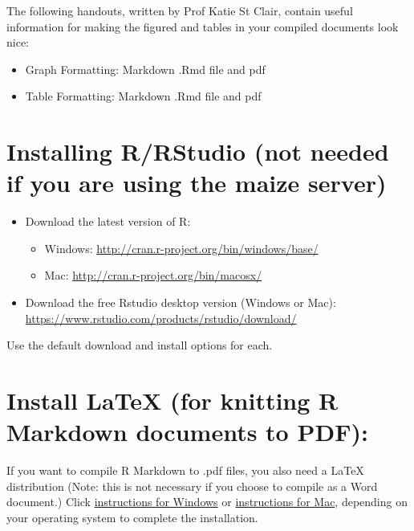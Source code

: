 \documentclass[
]{book}
\providecommand{\tightlist}{%
  \setlength{\itemsep}{0pt}\setlength{\parskip}{0pt}}
\begin{document}
The following handouts, written by Prof Katie St Clair, contain useful information for making the figured and tables in your compiled documents look nice:

\begin{itemize}
\tightlist
\item
  Graph Formatting: Markdown .Rmd file and pdf
\item
  Table Formatting: Markdown .Rmd file and pdf
\end{itemize}

\hypertarget{installing-rrstudio-not-needed-if-you-are-using-the-maize-server}{%
\section{Installing R/RStudio (not needed if you are using the maize server)}\label{installing-rrstudio-not-needed-if-you-are-using-the-maize-server}}

\begin{itemize}
\tightlist
\item
  Download the latest version of R:

  \begin{itemize}
  \tightlist
  \item
    Windows: \url{http://cran.r-project.org/bin/windows/base/}
  \item
    Mac: \url{http://cran.r-project.org/bin/macosx/}
  \end{itemize}
\item
  Download the free Rstudio desktop version (Windows or Mac): \url{https://www.rstudio.com/products/rstudio/download/}
\end{itemize}

Use the default download and install options for each.

\hypertarget{install-latex-for-knitting-r-markdown-documents-to-pdf}{%
\section{Install LaTeX (for knitting R Markdown documents to PDF):}\label{install-latex-for-knitting-r-markdown-documents-to-pdf}}

If you want to compile R Markdown to .pdf files, you also need a LaTeX distribution (Note: this is not necessary if you choose to compile as a Word document.) Click \href{http://www.miktex.org/}{instructions for Windows} or \href{https://tug.org/mactex/}{instructions for Mac}, depending on your operating system to complete the installation.
\end{document}

